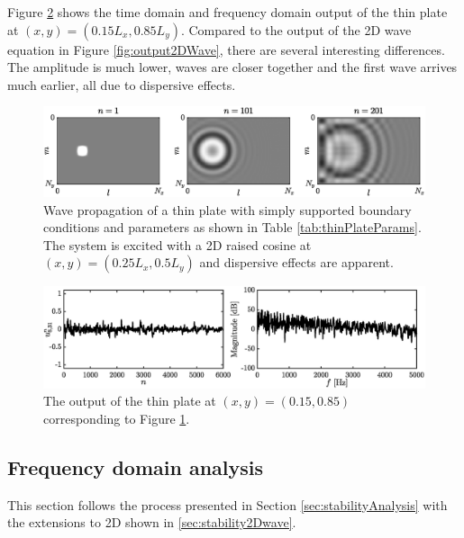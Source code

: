 {\renewcommand{\arraystretch}{1}

Figure \ref{fig:outputThinPlate} shows the time domain and frequency domain output of the thin plate at $(x,y) = (0.15L_x, 0.85 L_y)$.
Compared to the output of the 2D wave equation in Figure \ref{fig:output2DWave}, there are several interesting differences. The amplitude is much lower, waves are closer together and the first wave arrives much earlier, all due to dispersive effects.
\begin{figure}[h]
    \centering
    \includegraphics[width = \textwidth]{figures/resonators/2d/thinPlatePropagation.eps}
    \caption{Wave propagation of a thin plate with simply supported boundary conditions and parameters as shown in Table \ref{tab:thinPlateParams}. The system is excited with a 2D raised cosine at $(x,y) = (0.25L_x, 0.5L_y)$ and dispersive effects are apparent.\label{fig:thinPlatePropagation}}
\end{figure}

\begin{figure}[h]
    \centering
    \includegraphics[width=\textwidth]{figures/resonators/2d/outputThinPlate.eps}
    \caption{The output of the thin plate at $(x,y) = (0.15, 0.85)$ corresponding to Figure \ref{fig:thinPlatePropagation}. \label{fig:outputThinPlate}}
\end{figure}

\subsection{Frequency domain analysis}\label{sec:stabilityThinPlate}
This section follows the process presented in Section \ref{sec:stabilityAnalysis} with the extensions to 2D shown in \ref{sec:stability2Dwave}.

}
